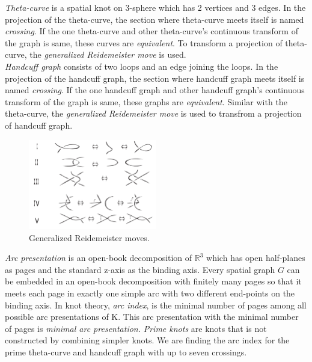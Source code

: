 \documentclass{article}
\theoremstyle{definition}
\theoremstyle{theorem}
\theoremstyle{proposition}
\theoremstyle{corollary}
\begin{document}
\textit{Theta-curve} is a spatial knot on 3-sphere which has 2 vertices and 3 edges. In the projection of the theta-curve, the section where theta-curve meets itself is named \textit{crossing}. If the one theta-curve and other theta-curve's continuous transform of the graph is same, these curves are \textit{equivalent}. To transform a projection of theta-curve, the \textit{generalized Reidemeister move} is used.\\

\textit{Handcuff graph} consists of two loops and an edge joining the loops. In the projection of the handcuff graph, the section where handcuff graph meets itself is named \textit{crossing}. If the one handcuff graph and other handcuff graph's continuous transform of the graph is same, these graphs are \textit{equivalent}. Similar with the theta-curve, the \textit{generalized Reidemeister move} is used to transfrom a projection of handcuff graph.\\

\begin{figure}
    \centerline{\includegraphics[width=0.5\textwidth]{generalized_reidemeister.png}}
    \caption{Generalized Reidemeister moves.}
    \label{figure_1} 
\end{figure}

\textit{Arc presentation} is an open-book decomposition of $\mathbb{R}^3$ which has open half-planes as pages and the standard z-axis as the binding axis. Every spatial graph $G$ can be embedded in an open-book decomposition with finitely many pages so that it meets each page in exactly one simple arc with two different end-points on the binding axis.
In knot theory, \textit{arc index}, is the minimal number of pages among all possible arc presentations of K.
This arc presentation with the minimal number of pages is \textit{minimal arc presentation.} \textit{Prime knots} are knots that is not constructed by combining simpler knots. We are finding the arc index for the prime theta-curve and handcuff graph with up to seven crossings.\\
\end{document}
